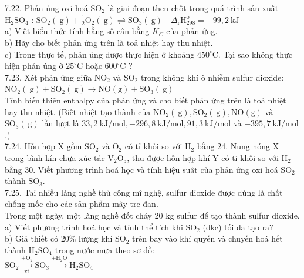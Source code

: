 \documentclass[10pt]{article}
\begin{document}
7.22. Phản úng oxi hoá $\mathrm{SO}_{2}$ là giai đoạn then chốt trong quá trình sản xuất $\mathrm{H}_{2} \mathrm{SO}_{4}$ : $\mathrm{SO}_{2}(\mathrm{~g})+\frac{1}{2} \mathrm{O}_{2}(\mathrm{~g}) \rightleftharpoons \mathrm{SO}_{3}(\mathrm{~g}) \quad \Delta_{\mathrm{r}} \mathrm{H}_{298}^{\mathrm{o}}=-99,2 \mathrm{~kJ}$\\
a) Viết biểu thức tính hằng số cân bằng $K_{C}$ của phản ứng.\\
b) Hãy cho biết phản ứng trên là toả nhiệt hay thu nhiệt.\\
c) Trong thực tế, phản úng được thực hiện ở khoảng $450^{\circ} \mathrm{C}$. Tại sao không thực hiện phản úng ờ $25^{\circ} \mathrm{C}$ hoặc $600^{\circ} \mathrm{C}$ ?\\
7.23. Xét phản ứng giữa $\mathrm{NO}_{2}$ và $\mathrm{SO}_{2}$ trong không khí ô nhiễm sulfur dioxide:\\
$\mathrm{NO}_{2}(\mathrm{~g})+\mathrm{SO}_{2}(\mathrm{~g}) \longrightarrow \mathrm{NO}(\mathrm{g})+\mathrm{SO}_{3}(\mathrm{~g})$\\
Tính biến thiên enthalpy của phản ứng và cho biết phản ứng trên là toả nhiệt hay thu nhiệt. (Biết nhiệt tạo thành của $\mathrm{NO}_{2}(\mathrm{~g}), \mathrm{SO}_{2}(\mathrm{~g}), \mathrm{NO}(\mathrm{g})$ và $\mathrm{SO}_{3}(\mathrm{~g})$ lần lượt là $33,2 \mathrm{~kJ} / \mathrm{mol},-296,8 \mathrm{~kJ} / \mathrm{mol}, 91,3 \mathrm{~kJ} / \mathrm{mol}$ và $-395,7 \mathrm{~kJ} / \mathrm{mol}$.)\\
7.24. Hỗn hợp X gồm $\mathrm{SO}_{2}$ và $\mathrm{O}_{2}$ có tỉ khối so với $\mathrm{H}_{2}$ bằng 24. Nung nóng X trong bình kín chưa xúc tác $\mathrm{V}_{2} \mathrm{O}_{5}$, thu được hỗn hợp khí Y có ti khối so với $\mathrm{H}_{2}$ bằng 30. Viết phương trình hoá học và tính hiệu suât của phản ứng oxi hoá $\mathrm{SO}_{2}$ thành $\mathrm{SO}_{3}$.\\
7.25. Tai nhiều làng nghề thủ công mî nghệ, sulfur dioxide được dùng là chất chống mốc cho các sản phẩm mây tre đan.\\
Trong một ngày, một làng nghề đốt cháy 20 kg sulfur để tạo thành sulfur dioxide.\\
a) Viết phương trình hoá học và tính thể tích khi $\mathrm{SO}_{2}$ (đkc) tối đa tạo ra?\\
b) Giả thiết có $20 \%$ lượng khí $\mathrm{SO}_{2}$ trên bay vào khí quyển và chuyển hoá hết thành $\mathrm{H}_{2} \mathrm{SO}_{4}$ trong nước mưa theo sơ đồ:\\
$\mathrm{SO}_{2} \xrightarrow[\mathrm{xt}]{+\mathrm{O}_{2}} \mathrm{SO}_{3} \xrightarrow{+\mathrm{H}_{2} \mathrm{O}} \mathrm{H}_{2} \mathrm{SO}_{4}$
\end{document}
